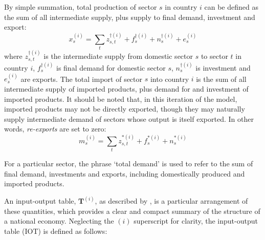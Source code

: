 \documentclass[a4paper]{article}
\begin{document}
By simple summation, total production of sector $s$ in country $i$ can be defined as the sum of all intermediate supply, plus supply to final demand, investment and export:
\begin{equation}\label{eqn:x}
x_s^{(i)}=\sum\limits_{t}z_{s,t}^{\dagger(i)} + f_s^{\dagger(i)} + n_s^{\dagger(i)} + e_s^{(i)}
\end{equation}
where $z_{s,t}^{\dagger(i)}$ is the intermediate supply from domestic sector $s$ to sector $t$ in country $i$, $f_s^{\dagger(i)}$ is final demand for domestic sector $s$, $n_s^{\dagger(i)}$ is investment and $e_s^{(i)}$ are exports.
The total import of sector $s$ into country $i$ is the sum of all intermediate supply of imported products, plus demand for and investment of imported products. 
It should be noted that, in this iteration of the model, imported products may not be directly exported, though they may naturally supply intermediate demand of sectors whose output is itself exported.
In other words, \textit{re-exports} are set to zero:
\begin{equation}\label{eqn:m}
m_s^{(i)}=\sum\limits_{t}z_{s,t}^{*(i)} + f_s^{*(i)} + n_s^{*(i)}
\end{equation}

For a particular sector, the phrase `total demand' is used to refer to the sum of final demand, investments and exports, including domestically produced and imported products.

An input-output table, $\boldsymbol{T}^{(i)}$, as described by \textcite{miller_input-output_1985}, is a particular arrangement of these quantities, which provides a clear and compact summary of the structure of a national economy.
Neglecting the $(i)$ superscript for clarity, the input-output table (IOT) is defined as follows:
\end{document}
